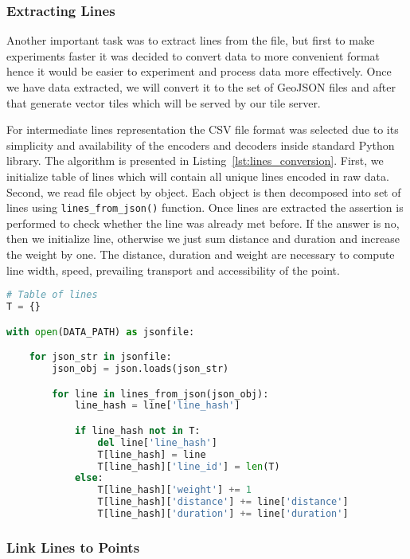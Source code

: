 \subsubsection{Extracting Lines}

Another important task was to extract lines from the file, but first to make experiments faster
it was decided to convert data to more convenient format hence it would be easier to
experiment and process data more effectively. Once we have data extracted, we will convert it
to the set of GeoJSON files and after that generate vector tiles which will be served by our
tile server.

For intermediate lines representation the CSV file format was selected due to its simplicity
and availability of the encoders and decoders inside standard Python library. The algorithm is
presented in Listing~\ref{lst:lines_conversion}. First, we initialize table of lines which will
contain all unique lines encoded in raw data. Second, we read file object by object. Each object
is then decomposed into set of lines using \lstinline|lines_from_json()| function. Once lines are
extracted the assertion is performed to check whether the line was already met before. If the
answer is no, then we initialize line, otherwise we just sum distance and duration
and increase the weight by one. The distance, duration and weight are necessary to compute
line width, speed, prevailing transport and accessibility of the point.


\begin{lstlisting}[language=python, caption=Lines conversion., label={lst:lines_conversion}]
# Table of lines
T = {}

with open(DATA_PATH) as jsonfile:

    for json_str in jsonfile:
        json_obj = json.loads(json_str)

        for line in lines_from_json(json_obj):
            line_hash = line['line_hash']

            if line_hash not in T:
                del line['line_hash']
                T[line_hash] = line
                T[line_hash]['line_id'] = len(T)
            else:
                T[line_hash]['weight'] += 1
                T[line_hash]['distance'] += line['distance']
                T[line_hash]['duration'] += line['duration']
\end{lstlisting}

\subsubsection{Link Lines to Points}

